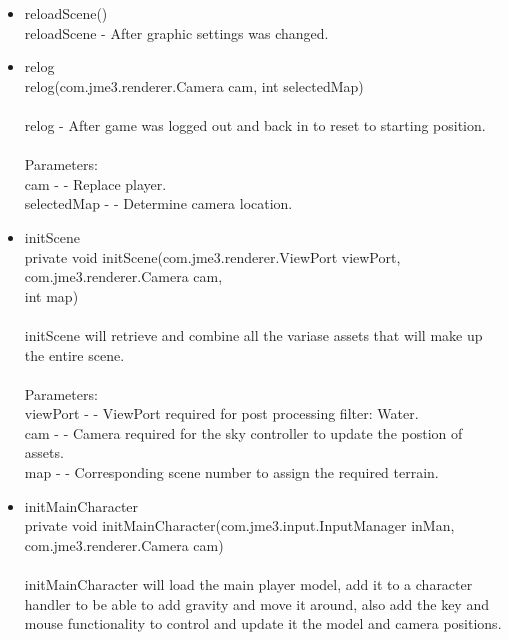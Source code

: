 \documentclass[letterpaper]{article}
\begin{document}
\begin{itemize}
\begin{itemize}
											\item	reloadScene() \\
													reloadScene - After graphic settings was changed. \\
											\item	relog \\
													relog(com.jme3.renderer.Camera cam, int selectedMap) \\ \\
													relog - After game was logged out and back in to reset to starting position. \\ \\
													Parameters: \\
													cam - - Replace player. \\
													selectedMap - - Determine camera location. \\
											\item	initScene \\
													private void initScene(com.jme3.renderer.ViewPort viewPort,
													             com.jme3.renderer.Camera cam, \\
													             int map) \\ \\
													initScene will retrieve and combine all the variase assets that will make up the entire scene. \\ \\
													Parameters: \\
													viewPort - - ViewPort required for post processing filter: Water. \\
													cam - - Camera required for the sky controller to update the postion of assets. \\
													map - - Corresponding scene number to assign the required terrain. \\
											\item	initMainCharacter \\
													private void initMainCharacter(com.jme3.input.InputManager inMan, \\
													                     com.jme3.renderer.Camera cam) \\ \\
													initMainCharacter will load the main player model, add it to a character handler to be able to add gravity and move it around, also add the key and mouse functionality to control and update it the model and camera positions. \\ \\

\end{itemize}
\end{itemize}
\end{document}
